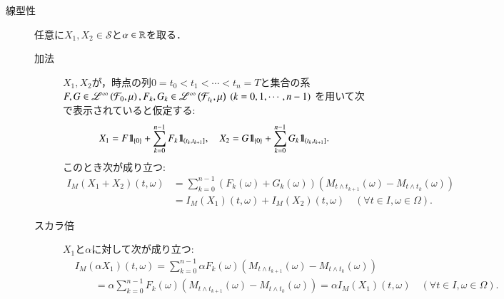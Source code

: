 	\begin{prf}\mbox{}
		\begin{description}
			\item[線型性]
				任意に$X_1,X_2 \in \mathcal{S}$と$\alpha \in \mathbb{R}$を取る．
				\begin{description}
					\item[加法]
						$X_1,X_2$が，時点の列$0=t_0<t_1<\cdots<t_n = T$と集合の系$F,G \in \mathscr{L}^{\infty} \left(\mathcal{F}_0,\mu\right),
						F_k,G_k \in \mathscr{L}^{\infty} \left(\mathcal{F}_{t_k},\mu\right)\ (k=0,1,\cdots,n-1)$
						を用いて次で表示されていると仮定する:
						\begin{align}
							X_1 = F \mbox{1}\hspace{-0.25em}\mbox{l}_{\{0\}} + \sum_{k=0}^{n-1} F_k \mbox{1}\hspace{-0.25em}\mbox{l}_{\left(t_k,t_{k+1}\right]},
							\quad X_2 = G \mbox{1}\hspace{-0.25em}\mbox{l}_{\{0\}} + \sum_{k=0}^{n-1} G_k \mbox{1}\hspace{-0.25em}\mbox{l}_{\left(t_k,t_{k+1}\right]}.
						\end{align}
						このとき次が成り立つ:
						\begin{align}
							I_M(X_1 + X_2)(t,\omega)
							&= \sum_{k=0}^{n-1} \left( F_k(\omega) + G_k(\omega) \right) \left( M_{t \wedge t_{k+1}}(\omega) - M_{t \wedge t_k}(\omega) \right) \\
							&= I_M(X_1)(t,\omega) + I_M(X_2)(t,\omega)
							\quad (\forall t \in I,\omega \in \Omega).
						\end{align}
					\item[スカラ倍]
						$X_1$と$\alpha$に対して次が成り立つ:
						\begin{align}
							&I_M(\alpha X_1)(t,\omega)
							= \sum_{k=0}^{n-1} \alpha F_k(\omega) \left(M_{t \wedge t_{k+1}}(\omega) - M_{t \wedge t_k}(\omega)\right) \\
							&\qquad= \alpha \sum_{k=0}^{n-1} F_k(\omega) \left(M_{t \wedge t_{k+1}}(\omega) - M_{t \wedge t_k}(\omega)\right)
							= \alpha I_M(X_1)(t,\omega)
							\quad (\forall t \in I,\omega \in \Omega).
						\end{align}
				\end{description}
				

\end{description}
\end{prf}
